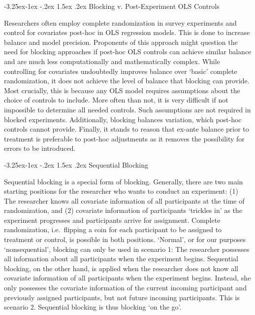 \documentclass[12pt,]{article}
\makeatletter
\renewcommand\subsubsection{\@startsection{subsubsection}{3}{\z@}
                                     {-3.25ex\@plus -1ex \@minus -.2ex}
                                     {1.5ex \@plus .2ex}
                                     {\normalsize\itshape}} %
\makeatother
\begin{document}
\subsubsection{Blocking v. Post-Experiment OLS Controls}\label{seq-ols}

Researchers often employ complete randomization in survey experiments
and control for covariates post-hoc in OLS regression models. This is
done to increase balance and model precision. Proponents of this
approach might question the need for blocking approaches if post-hoc OLS
controls can achieve similar balance and are much less computationally
and mathematically complex. While controlling for covariates undoubtedly
improves balance over `basic' complete randomization, it does not
achieve the level of balance that blocking can provide. Most crucially,
this is because any OLS model requires assumptions about the choice of
controls to include. More often than not, it is very difficult if not
impossible to determine all needed controls. Such assumptions are not
required in blocked experiments. Additionally, blocking balances
variation, which post-hoc controls cannot provide. Finally, it stands to
reason that ex-ante balance prior to treatment is preferable to post-hoc
adjustments as it removes the possibility for errors to be introduced.

\subsubsection{Sequential Blocking}\label{seq-sequential}

Sequential blocking is a special form of blocking. Generally, there are
two main starting positions for the researcher who wants to conduct an
experiment: (1) The researcher knows all covariate information of all
participants at the time of randomization, and (2) covariate information
of participants `trickles in' as the experiment progresses and
participants arrive for assignment. Complete randomization,
i.e.~flipping a coin for each participant to be assigned to treatment or
control, is possible in both positions. `Normal', or for our purposes
`nonsequential', blocking can only be used in scenario 1: The researcher
possesses all information about all participants when the experiment
begins. Sequential blocking, on the other hand, is applied when the
researcher does not know all covariate information of all participants
when the experiment begins. Instead, she only possesses the covariate
information of the current incoming participant and previously assigned
participants, but not future incoming participants. This is scenario 2.
Sequential blocking is thus blocking `on the go'.
\end{document}
